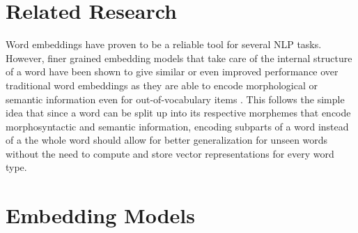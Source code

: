 \documentclass[11pt]{article}
\begin{document}
\section{Related Research}
Word embeddings have proven to be a reliable tool for several NLP tasks. However, finer grained embedding models that take care of the internal structure of a word have been shown to give similar or even improved performance over traditional word embeddings as they are able to encode morphological \cite{dos2014learning} or semantic \cite{chen2015joint} information even for out-of-vocabulary items \cite{ling2015finding}. This follows the simple idea that since a word can be split up into its respective morphemes that encode morphosyntactic and semantic information, encoding subparts of a word instead of a the whole word should allow for better generalization for unseen words without the need to compute and store vector representations for every word type. 
\section{Embedding Models}
\end{document}
